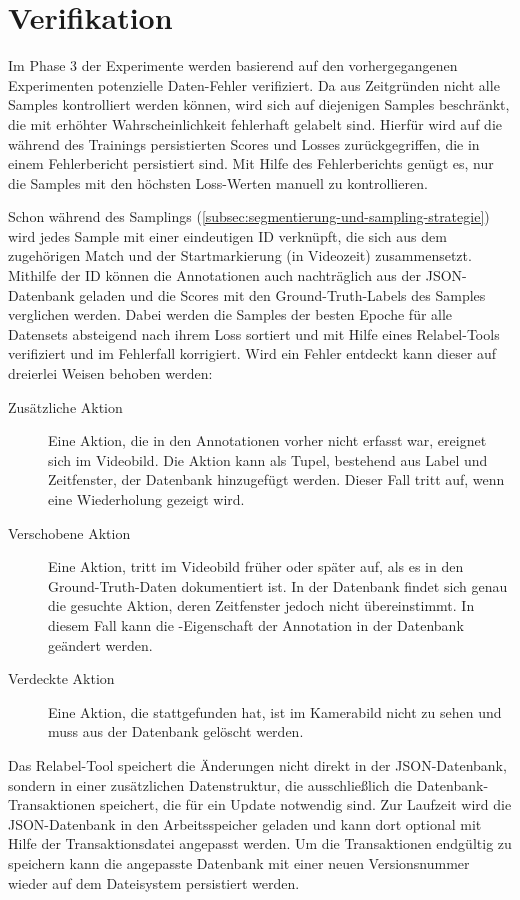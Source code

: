 \section{Verifikation}
\label{sec:nachgang}

Im Phase 3 der Experimente werden basierend auf den vorhergegangenen Experimenten potenzielle Daten-Fehler verifiziert.
Da aus Zeitgründen nicht alle Samples kontrolliert werden können, wird sich auf diejenigen Samples beschränkt, die mit erhöhter Wahrscheinlichkeit fehlerhaft gelabelt sind.
Hierfür wird auf die während des Trainings persistierten Scores und Losses zurückgegriffen, die in einem Fehlerbericht persistiert sind.
Mit Hilfe des Fehlerberichts genügt es, nur die Samples mit den höchsten Loss-Werten manuell zu kontrollieren.

Schon während des Samplings (\autoref{subsec:segmentierung-und-sampling-strategie}) wird jedes Sample mit einer eindeutigen ID verknüpft, die sich aus dem zugehörigen Match und der Startmarkierung (in Videozeit) zusammensetzt.
Mithilfe der ID können die Annotationen auch nachträglich aus der JSON-Datenbank geladen und die Scores mit den Ground-Truth-Labels des Samples verglichen werden.
Dabei werden die Samples der besten Epoche für alle Datensets absteigend nach ihrem Loss sortiert und mit Hilfe eines Relabel-Tools verifiziert und im Fehlerfall \ggf korrigiert.
Wird ein Fehler entdeckt kann dieser auf dreierlei Weisen behoben werden:

\begin{description}
    \item[Zusätzliche Aktion] Eine Aktion, die in den Annotationen vorher nicht erfasst war, ereignet sich im Videobild.
    Die Aktion kann als Tupel, bestehend aus Label und Zeitfenster, der Datenbank hinzugefügt werden.
    Dieser Fall tritt \zB auf, wenn eine Wiederholung gezeigt wird.
    \item[Verschobene Aktion] Eine Aktion, tritt im Videobild früher oder später auf, als es in den Ground-Truth-Daten dokumentiert ist.
    In der Datenbank findet sich genau die gesuchte Aktion, deren Zeitfenster jedoch nicht übereinstimmt.
    In diesem Fall kann die -Eigenschaft der Annotation in der Datenbank geändert werden.
    \item[Verdeckte Aktion] Eine Aktion, die stattgefunden hat, ist im Kamerabild nicht zu sehen und muss aus der Datenbank gelöscht werden.
\end{description}

Das Relabel-Tool speichert die Änderungen nicht direkt in der JSON-Datenbank, sondern in einer zusätzlichen Datenstruktur, die ausschließlich die Datenbank-Transaktionen speichert, die für ein Update notwendig sind.
Zur Laufzeit wird die JSON-Datenbank in den Arbeitsspeicher geladen und kann dort optional mit Hilfe der Transaktionsdatei angepasst werden.
Um die Transaktionen endgültig zu speichern kann die angepasste Datenbank mit einer neuen Versionsnummer wieder auf dem Dateisystem persistiert werden.
